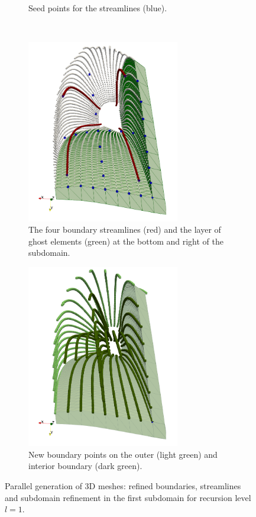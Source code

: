 \begin{figure}
\begin{subfigure}[t]{0.45\textwidth}
    \caption{Seed points for the streamlines (blue).}%
    \label{fig:03_seed_points}%
  \end{subfigure}
  \\
  \begin{subfigure}[t]{0.45\textwidth}%
    \centering%
    \includegraphics[height=8cm]{images/parallel_fiber_estimation/05_corner_streamlines_corner.png}
    \caption{The four boundary streamlines (red) and the layer of ghost elements (green) at the bottom and right of the subdomain.}%
    \label{fig:05_corner_streamlines}%
  \end{subfigure}   
  \quad
  \begin{subfigure}[t]{0.45\textwidth}%
    \centering%
    \includegraphics[height=8cm]{images/parallel_fiber_estimation/07_filled_corner.png}
    \caption{New boundary points on the outer (light green) and interior boundary (dark green).}%
    \label{fig:07_filled}%
  \end{subfigure}  
  \caption{Parallel generation of 3D meshes: refined boundaries, streamlines and subdomain refinement in the first subdomain for recursion level $l=1$.}%
  \label{fig:03_boundary_points_and_seed_points}%
\end{figure}%


